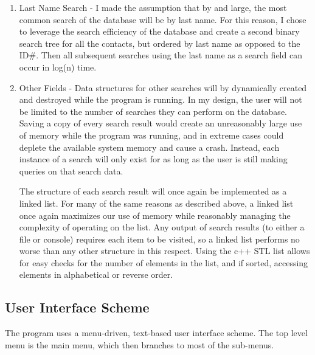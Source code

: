 \documentclass[11pt]{article}
\begin{document}
\begin{enumerate}
		\begin{enumerate}
			\item Last Name Search - I made the assumption that by and large, the most common search of the database will
									  be by last name. For this reason, I chose to leverage the search efficiency of the
									  database and create a second binary search tree for all the contacts, but ordered by
									  last name as opposed to the ID\#. Then all subsequent searches using the last name 
									  as a search field can occur in log(n) time.
			
			\item Other Fields - Data structures for other searches will by dynamically created and destroyed while the 
								 program is running. In my design, the user will not be limited to the number of searches
								 they can perform on the database. Saving a copy of every search result would create an
								 unreasonably large use of memory while the program was running, and in extreme cases could
								 deplete the available system memory and cause a crash. Instead, each instance of a search
								 will only exist for as long as the user is still making queries on that search data.
								 
								 The structure of each search result will once again be implemented as a linked list. For 
								 many of the same reasons as described above, a linked list once again maximizes our use 
								 of memory while reasonably managing the complexity of operating on the list. Any output of 
								 search results (to either a file or console) requires each item to be visited, so a linked
								 list performs no worse than any other structure in this respect. Using the c++ STL list 
								 allows for easy checks for the number of elements in the list, and if sorted, accessing
								 elements in alphabetical or reverse order.
		\end{enumerate}
			  		
		
	\end{enumerate}

\subsection*{User Interface Scheme}


	The program uses a menu-driven, text-based user interface scheme. The top level menu is the main menu, which then 
branches to most of the sub-menus.

\vspace{.25cm}
\end{document}
